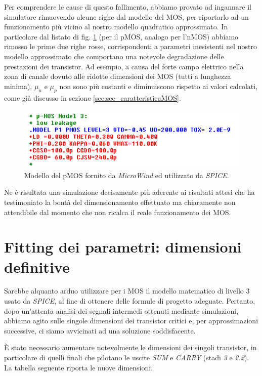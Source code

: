 Per comprendere le cause di questo fallimento, abbiamo provato ad ingannare il simulatore rimuovendo alcune righe dal modello del MOS, per riportarlo ad un funzionamento più vicino al nostro modello quadratico approssimato. In particolare dal listato di fig. \ref{fig:modelloMOSSpice} (per il pMOS, analogo per l'nMOS) abbiamo rimosso le prime due righe rosse, corrispondenti a parametri inesistenti nel nostro modello approssimato che comportano una notevole degradazione delle prestazioni dei transistor. Ad esempio, a causa del forte campo elettrico nella zona di canale dovuto alle ridotte dimensioni dei MOS (tutti a lunghezza minima), $\mu_n$ e $\mu_p$ non sono più costanti e diminuiscono rispetto ai valori calcolati, come già discusso in sezione \ref{sec:sec_caratteristicaMOS}.

\begin{figure}[hbt!]
	\centering
	\includegraphics{figure/Cir_Snapshot_ModelloDelPMOSDiMicrowind.png}
	\caption{Modello del pMOS fornito da \textit{MicroWind} ed utilizzato da \textit{SPICE}.}
	\label{fig:modelloMOSSpice}
\end{figure}

Ne è risultata una simulazione decisamente più aderente ai risultati attesi che ha testimoniato la bontà del dimensionamento effettuato ma chiaramente non attendibile dal momento che non ricalca il reale funzionamento dei MOS. 

\section{Fitting dei parametri: dimensioni definitive}
\label{sec:sec_fittingParametri}
Sarebbe alquanto arduo utilizzare per i MOS il modello matematico di livello 3 usato da \textit{SPICE}, al fine di ottenere delle formule di progetto adeguate. Pertanto, dopo un'attenta analisi dei segnali intermedi ottenuti mediante simulazioni, abbiamo agito sulle singole dimensioni dei transistor critici e, per approssimazioni successive, ci siamo avvicinati ad una soluzione soddisfacente.

\MakeUppercase{è} stato necessario aumentare notevolmente le dimensioni dei singoli transistor, in particolare di quelli finali che pilotano le uscite \textit{SUM} e \textit{CARRY} (stadi \textit{3} e \textit{2.2}). La tabella seguente riporta le nuove dimensioni.

